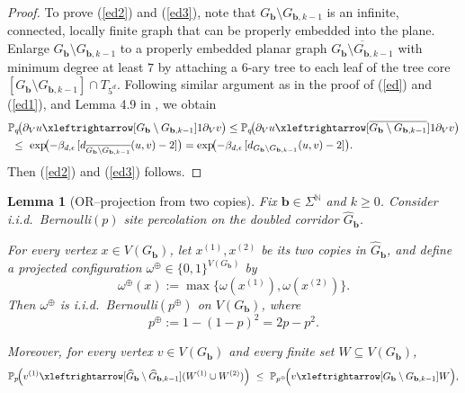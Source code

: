 \documentclass[11pt]{amsart}
\theoremstyle{plain}
\newtheorem{lemma}[theorem]{Lemma}
\numberwithin{equation}{section}
\numberwithin{figure}{section}
\newcommand\PP{{\mathbb P}}
\begin{document}
\begin{proof}
To prove (\ref{ed2}) and (\ref{ed3}),
note that $G_{\mathbf{b}}\setminus G_{\mathbf{b},k-1}$ is an infinite, connected, locally finite graph that can be properly embedded into the plane. Enlarge $G_{\mathbf b}\setminus G_{\mathbf b,k-1}$ to a properly embedded planar graph $\overline{G_{\mathbf b}\setminus G_{\mathbf b,k-1}}$
with minimum degree at least $7$ by attaching a $6$-ary tree to each leaf of the tree core
$[G_{\mathbf b}\setminus G_{\mathbf b,k-1}]\cap T_{5^d}$. Following similar argument as in the proof of (\ref{ed}) and (\ref{ed1}), and Lemma 4.9 in \cite{ZL231}, we obtain
\begin{align*}
&\PP_{q}\!\bigl(\partial_V u\xleftrightarrow[G_{\mathbf b}\setminus G_{\mathbf b,k-1}]{1}\partial_V v\bigr)\leq 
\PP_{q}\!\bigl(\partial_V u\xleftrightarrow[\overline{G_{\mathbf b}\setminus G_{\mathbf b,k-1}}]{1}\partial_V v\bigr)
\\
&\ \le\ \exp\!\bigl(-\beta_{d,\epsilon}\, [d_{\overline{G_{\mathbf b}\setminus G_{\mathbf b,k-1}}}(u,v)-2]\bigr)= \exp\!\bigl(-\beta_{d,\epsilon}\, [d_{G_{\mathbf b}\setminus G_{\mathbf b,k-1}}(u,v)-2]\bigr).
\end{align*}
Then (\ref{ed2}) and (\ref{ed3}) follows.
\end{proof}

\begin{lemma}[OR--projection from two copies]\label{lem:OR-proj}
Fix $\mathbf b\in\Sigma^{\mathbb N}$ and $k\ge 0$.  Consider i.i.d.\ Bernoulli$(p)$ site percolation
on the doubled corridor $\widehat G_{\mathbf b}$.

For every vertex $x\in V(G_{\mathbf b})$, let $x^{(1)},x^{(2)}$ be its two copies in $\widehat G_{\mathbf b}$, and define
a projected configuration $\omega^\oplus\in\{0,1\}^{V(G_{\mathbf b})}$ by
\[
\omega^\oplus(x):=\max\{\omega(x^{(1)}),\omega(x^{(2)})\}.
\]
Then $\omega^\oplus$ is i.i.d.\ Bernoulli$(p^\oplus)$ on $V(G_{\mathbf b})$, where
\[
p^\oplus:=1-(1-p)^2=2p-p^2.
\]

Moreover, for every vertex $v\in V(G_{\mathbf b})$ and every finite set $W\subseteq V(G_{\mathbf b})$,
\begin{equation}\label{eq:OR-dom}
\PP_{p}\!\Bigl(
v^{(1)} \xleftrightarrow[\widehat G_{\mathbf b}\setminus \widehat G_{\mathbf b,k-1}]{} (W^{(1)}\cup W^{(2)})
\Bigr)
\ \le\
\PP_{p^\oplus}\!\Bigl(
v \xleftrightarrow[G_{\mathbf b}\setminus G_{\mathbf b,k-1}]{} W
\Bigr),
\end{equation}
\end{lemma}
\end{document}
